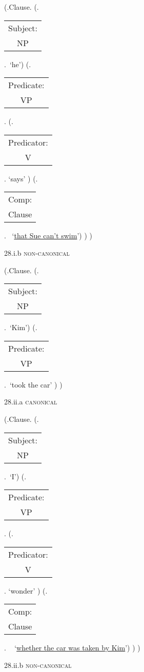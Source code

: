 \documentclass[12pt,letterpaper]{article}
\begin{document}
\begin{figure}
	\begin{center}
		\begin{parsetree}
			(.Clause.
			(.\begin{tabular}{c}Subject:\\NP\end{tabular}.~`he')
			(.\begin{tabular}{c}Predicate:\\VP\end{tabular}.
			(.\begin{tabular}{c}Predicator:\\V\end{tabular}. `says' )
			(.\begin{tabular}{c}Comp:\\Clause\end{tabular}.~ `\underline{that Sue can't swim}')
			)
			)
			
			\hfill \break\hfill \break
		\end{parsetree}
		28.i.b \textsc{non-canonical}
	\end{center}
\end{figure}
\clearpage
\begin{figure}
	\begin{center}
		\begin{parsetree}
			(.Clause.
			(.\begin{tabular}{c}Subject:\\NP\end{tabular}.~`Kim')
			(.\begin{tabular}{c}Predicate:\\VP\end{tabular}.~`took the car' )
			)
			
			\hfill \break\hfill \break
		\end{parsetree}
		28.ii.a \textsc{canonical}
	\end{center}
\end{figure}
\begin{figure}
	\begin{center}
		\begin{parsetree}
			(.Clause.
			(.\begin{tabular}{c}Subject:\\NP\end{tabular}.~`I')
			(.\begin{tabular}{c}Predicate:\\VP\end{tabular}.
			(.\begin{tabular}{c}Predicator:\\V\end{tabular}. `wonder' )
			(.\begin{tabular}{c}Comp:\\Clause\end{tabular}. ~ `\underline{whether the car was taken by Kim}')
			)
			)
			
			\hfill \break\hfill \break
		\end{parsetree}
		28.ii.b \textsc{non-canonical}
	\end{center}
\end{figure}
\end{document}
